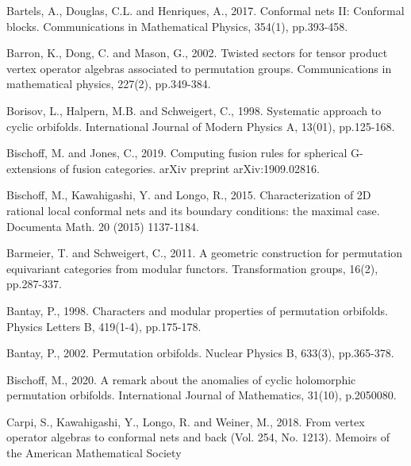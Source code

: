 \documentclass[11pt,b5paper,notitlepage]{article}
\theoremstyle{definition}
\theoremstyle{plain}
\numberwithin{equation}{subsection}
\begin{document}
\printindex	
	\begin{thebibliography}{999999}
		\footnotesize	
		
		
		
		


Bartels, A., Douglas, C.L. and Henriques, A., 2017. Conformal nets II: Conformal blocks. Communications in Mathematical Physics, 354(1), pp.393-458.


Barron, K., Dong, C. and Mason, G., 2002. Twisted sectors for tensor product vertex operator algebras associated to permutation groups. Communications in mathematical physics, 227(2), pp.349-384.

Borisov, L., Halpern, M.B. and Schweigert, C., 1998. Systematic approach to cyclic orbifolds. International Journal of Modern Physics A, 13(01), pp.125-168.


Bischoff, M. and Jones, C., 2019. Computing fusion rules for spherical G-extensions of fusion categories. arXiv preprint arXiv:1909.02816.


Bischoff, M., Kawahigashi, Y. and Longo, R., 2015. Characterization of 2D rational local conformal nets and its boundary conditions: the maximal case. Documenta Math. 20 (2015) 1137-1184.


Barmeier, T. and Schweigert, C., 2011. A geometric construction for permutation equivariant categories from modular functors. Transformation groups, 16(2), pp.287-337.


Bantay, P., 1998. Characters and modular properties of permutation orbifolds. Physics Letters B, 419(1-4), pp.175-178.

Bantay, P., 2002. Permutation orbifolds. Nuclear Physics B, 633(3), pp.365-378.

Bischoff, M., 2020. A remark about the anomalies of cyclic holomorphic permutation orbifolds. International Journal of Mathematics, 31(10), p.2050080.

Carpi, S., Kawahigashi, Y., Longo, R. and Weiner, M., 2018. From vertex operator algebras to conformal nets and back (Vol. 254, No. 1213). Memoirs of the American Mathematical Society




\end{thebibliography}
\end{document}
